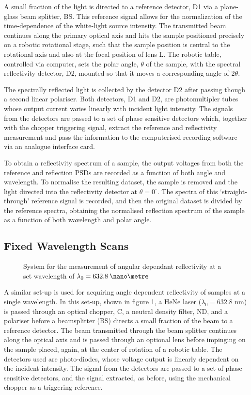 A small fraction of the light is directed to a reference detector, D1 via a plane-glass beam splitter, BS. This reference signal allows for the normalization of the time-dependence of the white-light source intensity. The transmitted beam continues along the primary optical axis and hits the sample positioned precisely on a robotic rotational stage, such that the sample position is central to the rotational axis and also at the focal position of lens L. The robotic table, controlled via computer, sets the polar angle, $\theta$ of the sample, with the spectral reflectivity detector, D2, mounted so that it moves a corresponding angle of $2\theta$.

The spectrally reflected light is collected by the detector D2 after passing though a second linear polariser. Both detectors, D1 and D2, are photomultipler tubes whose output current varies linearly with incident light intensity. The signals from the detectors are passed to a set of phase sensitive detectors which, together with the chopper triggering signal, extract the reference and reflectivity measurement and pass the information to the computerised recording software via an analogue interface card.

To obtain a reflectivity spectrum of a sample, the output voltages from both the reference and reflection PSDs are recorded as a function of both angle and wavelength. To normalise the resulting dataset, the sample is removed and the light directed into the reflectivity detector at $\theta=0^\circ$. The spectra of this `straight-through' reference signal is recorded, and then the original dataset is divided by the reference spectra, obtaining the normalised reflection spectrum of the sample as a function of both wavelength and polar angle. 

\subsection{Fixed Wavelength Scans}
\begin{figure}
\centering 
\caption{System for the measurement of angular dependant reflectivity at a set wavelength of $\lambda_0=632.8\:\nano\metre$\label{fig:HeNe}}
\end{figure}
A similar set-up is used for acquiring angle dependent reflectivity of samples at a single wavelength. In this set-up, shown in figure \ref{fig:HeNe}, a HeNe laser ($\lambda_0 = 632.8$ nm) is passed through an optical chopper, C, a neutral density filter, ND, and a polariser before a beamsplitter (BS) directs a small fraction of the beam to a reference detector. The beam transmitted through the beam splitter continues along the optical axis and is passed through an optional lens before impinging on the sample placed, again, at the center of rotation of a robotic table. The detectors used are photo-diodes, whose voltage output is linearly dependent on the incident intensity. The signal from the detectors are passed to a set of phase sensitive detectors, and the signal extracted, as before, using the mechanical chopper as a triggering reference. 

